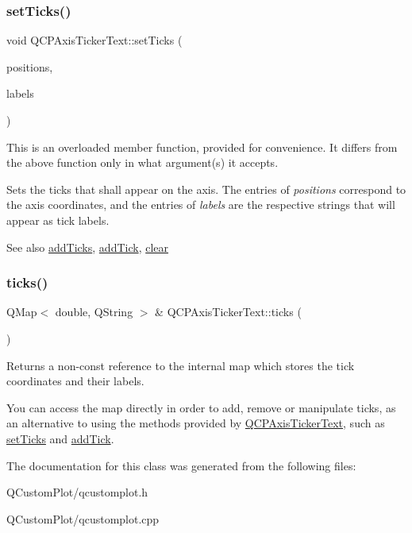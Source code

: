 \subsubsection{\texorpdfstring{set\+Ticks()}{setTicks()}\hspace{0.1cm}{\footnotesize\ttfamily [2/2]}}
{\footnotesize\ttfamily void Q\+C\+P\+Axis\+Ticker\+Text\+::set\+Ticks (\begin{DoxyParamCaption}\item[{const Q\+Vector$<$ double $>$ \&}]{positions,  }\item[{const Q\+Vector$<$ Q\+String $>$}]{labels }\end{DoxyParamCaption})}

This is an overloaded member function, provided for convenience. It differs from the above function only in what argument(s) it accepts.

Sets the ticks that shall appear on the axis. The entries of {\itshape positions} correspond to the axis coordinates, and the entries of {\itshape labels} are the respective strings that will appear as tick labels.

\begin{DoxySeeAlso}{See also}
\mbox{\hyperlink{class_q_c_p_axis_ticker_text_aba34051300eecaefbedb2df8feff2d45}{add\+Ticks}}, \mbox{\hyperlink{class_q_c_p_axis_ticker_text_aada3db69e5fc6585aaa4ea5d89552eb0}{add\+Tick}}, \mbox{\hyperlink{class_q_c_p_axis_ticker_text_a21826d2fcd9a25c194d34d4f67aa1460}{clear}} 
\end{DoxySeeAlso}
\mbox{\label{class_q_c_p_axis_ticker_text_ac84622a6bb4f2a98474e185ecaf3189a}} 
\subsubsection{\texorpdfstring{ticks()}{ticks()}}
{\footnotesize\ttfamily Q\+Map$<$ double, Q\+String $>$ \& Q\+C\+P\+Axis\+Ticker\+Text\+::ticks (\begin{DoxyParamCaption}{ }\end{DoxyParamCaption})\hspace{0.3cm}{\ttfamily [inline]}}

Returns a non-\/const reference to the internal map which stores the tick coordinates and their labels.

You can access the map directly in order to add, remove or manipulate ticks, as an alternative to using the methods provided by \mbox{\hyperlink{class_q_c_p_axis_ticker_text}{Q\+C\+P\+Axis\+Ticker\+Text}}, such as \mbox{\hyperlink{class_q_c_p_axis_ticker_text_a8cdf1f21940f1f53f5e3d30b2c74f5cf}{set\+Ticks}} and \mbox{\hyperlink{class_q_c_p_axis_ticker_text_aada3db69e5fc6585aaa4ea5d89552eb0}{add\+Tick}}. 

The documentation for this class was generated from the following files\+:\begin{DoxyCompactItemize}
\item 
Q\+Custom\+Plot/qcustomplot.\+h\item 
Q\+Custom\+Plot/qcustomplot.\+cpp\end{DoxyCompactItemize}
